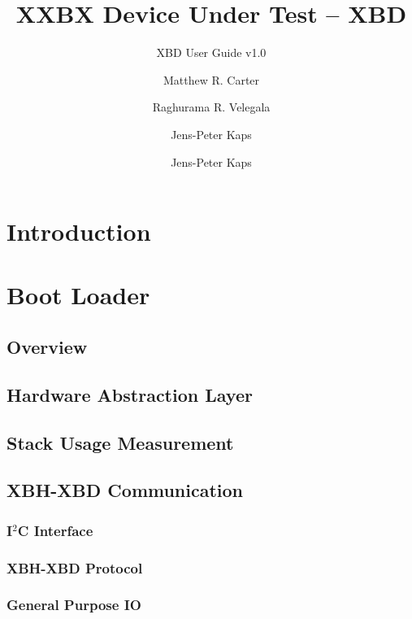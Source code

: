 \documentclass[twoside,11pt]{cergdoc}
\begin{document}
\title{XXBX Device Under Test -- XBD}
\subtitle{XBD User Guide v1.0}
\author{Matthew R. Carter \and Raghurama R. Velegala \and Jens-Peter Kaps}
\author{Jens-Peter Kaps}

\maketitle

\tableofcontents

\chapter{Introduction}
\chapter{Boot Loader}
  \section{Overview}
  \section{Hardware Abstraction Layer}
  \section{Stack Usage Measurement}
  \section{XBH-XBD Communication}
    \subsection{I$^2$C Interface}
    \subsection{XBH-XBD Protocol}
    \subsection{General Purpose IO}
\end{document}
